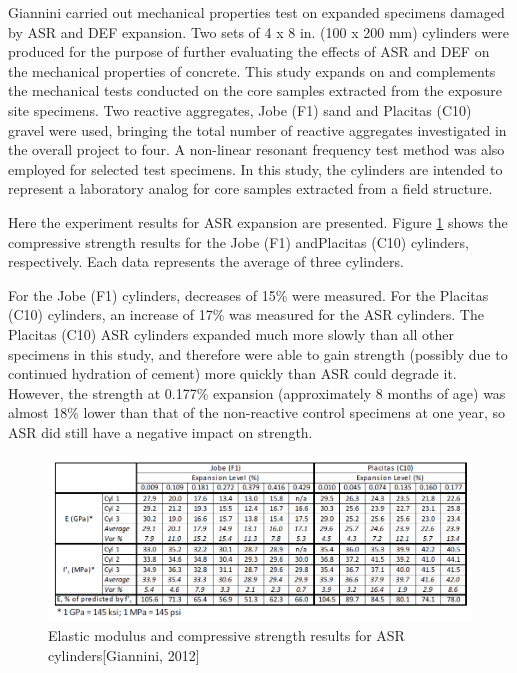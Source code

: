 \clearpage

Giannini carried out mechanical properties test on expanded specimens damaged by ASR and DEF expansion. Two sets of 4 x 8 in. (100 x 200 mm) cylinders were produced for the purpose of further evaluating the effects of ASR and DEF on the mechanical properties of concrete. This study expands on and complements the mechanical tests conducted on the core samples extracted from the exposure site specimens. Two reactive aggregates, Jobe (F1) sand and Placitas (C10) gravel were used, bringing the total number of reactive aggregates investigated in the overall project to four. A non-linear resonant frequency test method was also employed for selected test specimens. In this study, the cylinders are intended to represent a laboratory analog for core samples extracted from a field structure.

Here the experiment results for ASR expansion are presented. Figure \ref{Giannini, 2012} shows the compressive strength results for the Jobe (F1) andPlacitas (C10) cylinders, respectively. Each data represents the average of three cylinders.

For the Jobe (F1) cylinders, decreases of 15\% were measured. For the Placitas (C10) cylinders, an increase of 17\% was measured for the ASR cylinders. The Placitas (C10) ASR cylinders expanded much more slowly than all other specimens in this study, and therefore were able to gain strength (possibly due to continued hydration of cement) more quickly than ASR could degrade it. However, the strength at 0.177\% expansion (approximately 8 months of age) was almost 18\% lower than that of the non-reactive control specimens at one year, so ASR did still have a negative impact on strength.

\begin{figure}[h!]
  \centering
  \includegraphics[width=0.8\linewidth]{Reference/GIANNINIASR.png}
  \caption{Elastic modulus and compressive strength results for ASR cylinders[Giannini, 2012]}
  \label{Giannini, 2012}
\end{figure}
